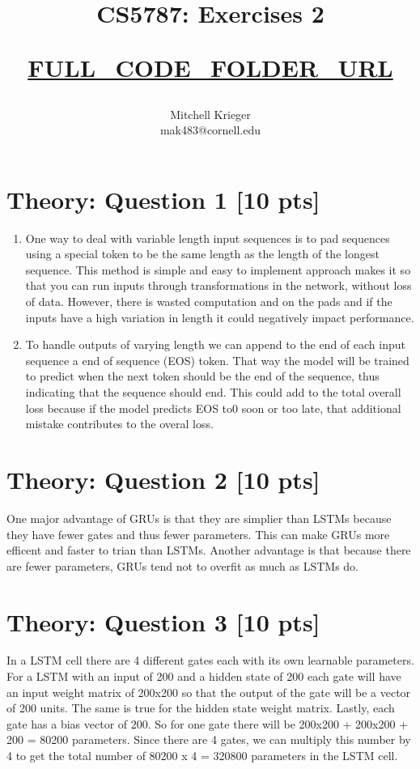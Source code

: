 \documentclass{article}
\title{CS5787: Exercises 2 \\ \begin{small}\url{FULL_CODE_FOLDER_URL}\end{small}}
\author{Mitchell Krieger \\ mak483@cornell.edu}
\date{}
\begin{document}
\maketitle

\section{Theory: Question 1 [10 pts]}

\begin{enumerate}[label=\alph*)]
    \item One way to deal with variable length input sequences is to pad sequences using a special token to be the same length as the length of the longest sequence. This method is simple and easy to implement approach makes it so that you can run inputs through transformations in the network, without loss of data. However, there is wasted computation and on the pads and if the inputs have a high variation in length it could negatively impact performance.
    \item To handle outputs of varying length we can append to the end of each input sequence a end of sequence (EOS) token. That way the model will be trained to predict when the next token should be the end of the sequence, thus indicating that the sequence should end. This could add to the total overall loss because if the model predicts EOS to0 soon or too late, that additional mistake contributes to the overal loss. 
\end{enumerate}

\section{Theory: Question 2 [10 pts]}

One major advantage of GRUs is that they are simplier than LSTMs because they have fewer gates and thus fewer parameters. This can make GRUs more efficent and faster to trian than LSTMs. Another advantage is that because there are fewer parameters, GRUs tend not to overfit as much as LSTMs do. 

\section{Theory: Question 3 [10 pts]}

In a LSTM cell there are 4 different gates each with its own learnable parameters. For a LSTM with an input of 200 and a hidden state of 200 each gate will have an input weight matrix of 200x200 so that the output of the gate will be a vector of 200 units. The same is true for the hidden state weight matrix. Lastly, each gate has a bias vector of 200. So for one gate there will be 200x200 + 200x200 + 200 = 80200 parameters. Since there are 4 gates, we can multiply this number by 4 to get the total number of 80200 x 4 = 320800 parameters in the LSTM cell.
\end{document}
